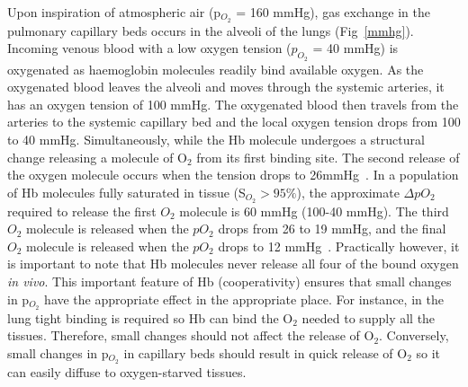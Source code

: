 Upon inspiration of atmospheric air (p$_{O_2}$ = 160 mmHg), gas exchange in the pulmonary capillary beds occurs in the alveoli of the lungs (Fig~\ref{mmhg}).
Incoming venous blood with a low oxygen tension ($p_{O_2}$ = 40 mmHg) is oxygenated as haemoglobin molecules readily bind available oxygen. 
As the oxygenated blood leaves the alveoli and moves through the systemic arteries, it has an oxygen tension of 100 mmHg. 
The oxygenated blood then travels from the arteries to the systemic capillary bed and the local oxygen tension drops from 100 to 40 mmHg.
Simultaneously, while the \acs{Hb} molecule undergoes a structural change releasing a molecule of O$_2$ from its first binding site.  
The second release of the oxygen molecule occurs when the tension drops to 26mmHg~\cite{GomezCambronero:2001hu}.
In a population of \acs{Hb} molecules fully saturated in tissue (S$_{O_2}>95\%$), the approximate $\Delta pO_2$ required to release the first ${O_2}$ molecule is 60 mmHg (100-40 mmHg).
The third ${O_2}$ molecule is released when the $pO_2$ drops from 26 to 19 mmHg, and the final ${O_2}$ molecule is released when the $pO_2$ drops to 12 mmHg~\cite{GomezCambronero:2001hu}.
Practically however, it is important to note that \acs{Hb} molecules never release all four of the bound oxygen \emph{in vivo}.
This important feature of \acs{Hb} (cooperativity) ensures that small changes in p$_{O_2}$ have the appropriate effect in the appropriate place. 
For instance, in the lung tight binding is required so \acs{Hb} can bind the O$_2$ needed to supply all the tissues.
Therefore, small changes should not affect the release of O$_2$.
Conversely, small changes in p$_{O_2}$ in capillary beds should result in quick release of O$_2$ so it can easily diffuse to oxygen-starved tissues. 

